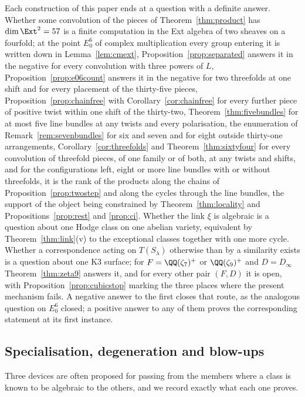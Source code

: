 Each construction of this paper ends at a question with a definite answer. Whether some convolution of the pieces of Theorem~\ref{thm:product} has $\dim\Ext^{2}=57$ is a finite computation in the Ext algebra of two sheaves on a fourfold; at the point $E_{0}^{6}$ of complex multiplication every group entering it is written down in Lemma~\ref{lem:cmext}, Proposition~\ref{prop:separated} answers it in the negative for every convolution with three powers of $L$, Proposition~\ref{prop:e06count} answers it in the negative for two threefolds at one shift and for every placement of the thirty-five pieces, Proposition~\ref{prop:chainfree} with Corollary~\ref{cor:chainfree} for every further piece of positive twist within one shift of the thirty-two, Theorem~\ref{thm:fivebundles} for at most five line bundles at any twists and every polarisation, the enumeration of Remark~\ref{rem:sevenbundles} for six and seven and for eight outside thirty-one arrangements, Corollary~\ref{cor:threefolds} and Theorem~\ref{thm:sixtyfour} for every convolution of threefold pieces, of one family or of both, at any twists and shifts, and for the configurations left, eight or more line bundles with or without threefolds, it is the rank of the products along the chains of Proposition~\ref{prop:twostep} and along the cycles through the line bundles, the support of the object being constrained by Theorem~\ref{thm:locality} and Propositions~\ref{prop:rest} and \ref{prop:ci}. Whether the link $\xi$ is algebraic is a question about one Hodge class on one abelian variety, equivalent by Theorem~\ref{thm:link}(v) to the exceptional classes together with one more cycle. Whether a correspondence acting on $T(S_{\lambda})$ otherwise than by a similarity exists is a question about one K3 surface; for $F=\QQ(\zeta_{7})^{+}$ or $\QQ(\zeta_{9})^{+}$ and $D=D_{\infty}$ Theorem~\ref{thm:zeta9} answers it, and for every other pair $(F,D)$ it is open, with Proposition~\ref{prop:cubicstop} marking the three places where the present mechanism fails. A negative answer to the first closes that route, as the analogous question on $E_{0}^{6}$ closed; a positive answer to any of them proves the corresponding statement at its first instance.

\subsection{Specialisation, degeneration and blow-ups}\label{ssec:bypass}

Three devices are often proposed for passing from the members where a class is known to be algebraic to the others, and we record exactly what each one proves.

